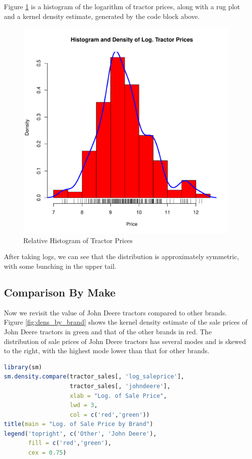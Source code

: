 \documentclass[11pt]{book}
\begin{document}
Figure \ref{fig:hist_dens_log_price} is
a histogram of the logarithm of tractor prices,
along with a rug plot and a kernel density estimate,
generated by the code block above.
%
\begin{figure}[h!]
  \centering
  \includegraphics[scale = 0.5, keepaspectratio=true]{../Figures/hist_dens_log_price}
  \caption{Relative Histogram of Tractor Prices} \label{fig:hist_dens_log_price}
\end{figure}
%
After taking logs, we can see that the distribution is
approximately symmetric, with some bunching in the
upper tail.

\pagebreak
\subsection{Comparison By Make}

Now we revisit the value of John Deere tractors
compared to other brands.
Figure \ref{fig:dens_by_brand} shows the
kernel density estimate of the sale prices of John Deere tractors
in green and that of the other brands in red.
%
The distribution of sale prices of John Deere tractors has several modes and is skewed to the right,
with the highest mode lower than that for other brands.


\begin{lstlisting}[language=R]
library(sm)
sm.density.compare(tractor_sales[, 'log_saleprice'],
                   tractor_sales[, 'johndeere'],
                   xlab = "Log. of Sale Price",
                   lwd = 3,
                   col = c('red','green'))
title(main = "Log. of Sale Price by Brand")
legend('topright', c('Other', 'John Deere'),
       fill = c('red','green'),
       cex = 0.75)
\end{lstlisting}
\end{document}
